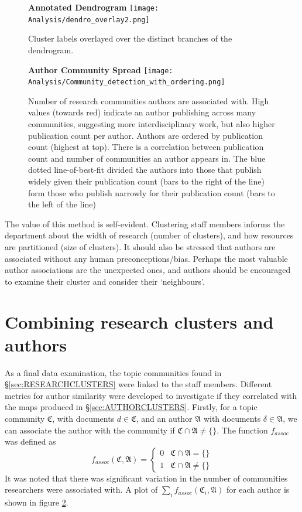 \begin{center}
\begin{figure}[H]
  \centering
  \textbf{Annotated Dendrogram}
    \texttt{[image: Analysis/dendro\_overlay2.png]}
    \caption[Dendrogram annotated with labelled fields]{Cluster labels overlayed over the distinct branches of the dendrogram.}
    \label{fig:LABELLEDDENDRO}
\end{figure} 
\end{center}
\newpage
\begin{center}
\begin{figure}[H]
  \centering
  \textbf{Author Community Spread}
    \texttt{[image: Analysis/Community\_detection\_with\_ordering.png]}
    \caption[Author Community Spread]{Number of research communities authors are associated with. High values (towards red) indicate an author publishing across many communities, suggesting more interdisciplinary work, but also higher publication count per author. Authors are ordered by publication count (highest at top). There is a correlation between publication count and number of communities an author appears in. The blue dotted line-of-best-fit divided the authors into those that publish widely given their publication count (bars to the right of the line) form those who publish narrowly for their publication count (bars to the left of the line)}
\label{fig:commbar}
\end{figure} 
\end{center}
\newpage
The value of this method is self-evident. Clustering staff members informs the department about the width of research (number of clusters), and how resources are partitioned (size of clusters). It should also be stressed that authors are associated without any human preconceptions/bias. Perhaps the most valuable author associations are the unexpected ones, and authors should be encouraged to examine their cluster and consider their `neighbours'.
\section{Combining research clusters and authors}
As a final data examination, the topic communities found in  \S\ref{sec:RESEARCHCLUSTERS} were linked to the staff members. Different metrics for author similarity were developed to investigate if they correlated with the maps produced in \S\ref{sec:AUTHORCLUSTERS}.
Firstly, for a topic community $\mathfrak{C}$, with documents $d \in \mathfrak{C}$, and an author $\mathfrak{A}$ with documents $\delta \in \mathfrak{A}$, we can associate the author with the community if $\mathfrak{C} \cap \mathfrak{A} \neq \{ \}$. The function $f_{assoc}$ was defined as 
\[ 
f_{assoc}\left( \mathfrak{C} , \mathfrak{A} \right) = \begin{cases} 
      0 & \mathfrak{C} \cap \mathfrak{A} = \{ \} \\
      1 & \mathfrak{C} \cap \mathfrak{A} \neq \{ \} 
   \end{cases}
\]
It was noted that there was significant variation in the number of communities researchers were associated with. A plot of $\sum_i f_{assoc} \left( \mathfrak{C}_i , \mathfrak{A} \right)$ for each author is shown in figure \ref{fig:commbar}.

